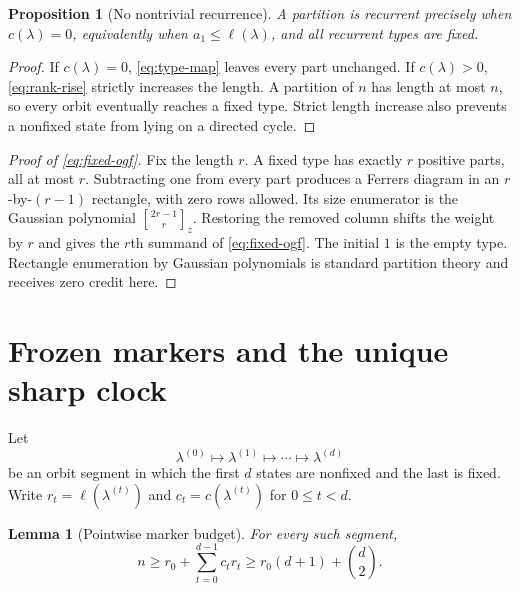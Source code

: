 \documentclass[10pt,a4paper]{amsart}
\newtheorem{proposition}[theorem]{Proposition}
\newtheorem{lemma}[theorem]{Lemma}
\theoremstyle{definition}
\theoremstyle{remark}
\newcommand{\len}{\ell}
\begin{document}
\begin{proposition}[No nontrivial recurrence]\label{prop:recurrent}
A partition is recurrent precisely when $c(\lambda)=0$, equivalently when
$a_1\leq\len(\lambda)$, and all recurrent types are fixed.
\end{proposition}

\begin{proof}
If $c(\lambda)=0$, \eqref{eq:type-map} leaves every part unchanged.  If
$c(\lambda)>0$, \eqref{eq:rank-rise} strictly increases the length.  A
partition of $n$ has length at most $n$, so every orbit eventually reaches a
fixed type.  Strict length increase also prevents a nonfixed state from
lying on a directed cycle.
\end{proof}

\begin{proof}[Proof of \eqref{eq:fixed-ogf}]
Fix the length $r$.  A fixed type has exactly $r$ positive parts, all at
most $r$.  Subtracting one from every part produces a Ferrers diagram in an
$r$-by-$(r-1)$ rectangle, with zero rows allowed.  Its size enumerator is
the Gaussian polynomial
$\genfrac{[}{]}{0pt}{}{2r-1}{r}_{z}$.  Restoring the removed column shifts
the weight by $r$ and gives the $r$th summand of \eqref{eq:fixed-ogf}.  The
initial $1$ is the empty type.  Rectangle enumeration by Gaussian
polynomials is standard partition theory \cite{Andrews1984} and receives
zero credit here.
\end{proof}

\section{Frozen markers and the unique sharp clock}

Let
\[
 \lambda^{(0)}\longmapsto\lambda^{(1)}\longmapsto\cdots
 \longmapsto\lambda^{(d)}
\]
be an orbit segment in which the first $d$ states are nonfixed and the last
is fixed.  Write $r_t=\len(\lambda^{(t)})$ and
$c_t=c(\lambda^{(t)})$ for $0\leq t<d$.

\begin{lemma}[Pointwise marker budget]\label{lem:budget}
For every such segment,
\begin{equation}\label{eq:marker-budget}
 n\geq r_0+\sum_{t=0}^{d-1}c_tr_t
   \geq r_0(d+1)+\binom d2.
\end{equation}
\end{lemma}
\end{document}
